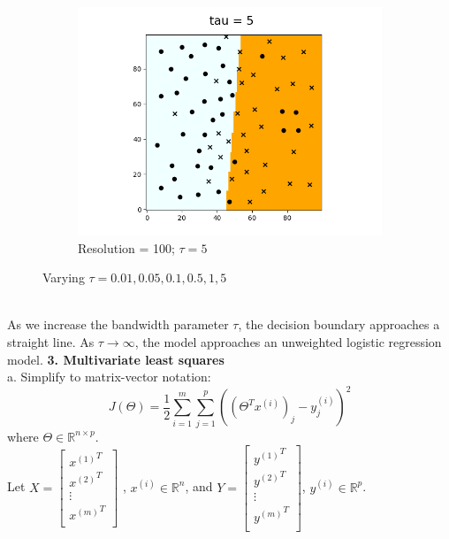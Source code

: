 \documentclass{article}
\newcommand{\R}{\mathbb{R}}
\begin{document}
\begin{figure}[!htb]
\begin{subfigure}{0.3\textwidth}
        \includegraphics[width=\linewidth]{res_100_tau_5}
        \caption{Resolution = 100; \(\tau=5\) }
        \label{fig:subfig9}
      \end{subfigure}

  
    \caption{Varying \(\tau = 0.01, 0.05, 0.1, 0.5, 1, 5\) }
    \label{fig:overall2}
\end{figure}
\\
As we increase the bandwidth parameter \(\tau\), the decision 
boundary approaches a straight line. As \(\tau \to \infty\), the model
approaches an unweighted logistic regression model.
\clearpage
{\large \bf 3. Multivariate least squares}\\
a. Simplify to matrix-vector notation:
\[
    J(\Theta) = \frac{1}{2} \sum_{i=1}^{m} \sum_{j=1}^{p} ((\Theta^T x^{(i)})_j - y_j^{(i)})^2
\] 
where \(\Theta \in \R ^{n \times p} \).
\\ Let \(X = \begin{bmatrix}
 {x^{(1)}}^T \\
 {x^{(2)}}^T\\
  \vdots \\
  {x^{(m)}}^T \\
\end{bmatrix}\) , \(x^{(i)} \in \R^{n}\), and \(Y = \begin{bmatrix}
    {y^{(1)}}^T \\
    {y^{(2)}}^T\\
     \vdots \\
     {y^{(m)}}^T \\
\end{bmatrix}\), \(y^{(i)} \in \R^{p}\).
\end{document}
